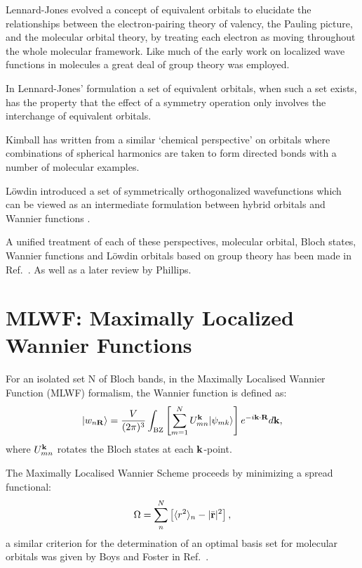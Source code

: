 Lennard-Jones evolved a concept of equivalent 
orbitals \cite{lennardjones49a,lennardjones49b, hall50}
to elucidate the relationships between the electron-pairing theory of valency, 
the Pauling picture, and the molecular orbital theory, by treating each 
electron as moving throughout the whole molecular 
framework. Like much of the early work on localized wave functions in molecules 
a great deal of group theory was employed.

In Lennard-Jones' formulation a set of equivalent orbitals, 
when such a set exists, has the property that the effect of a symmetry 
operation only involves the interchange of equivalent orbitals.

Kimball has written from a similar `chemical perspective' 
on orbitals where combinations of spherical harmonics are taken to form
directed bonds \cite{kimball41} with a number of molecular examples.

L\"owdin introduced a set of symmetrically orthogonalized wavefunctions which 
can be viewed as an intermediate formulation between hybrid orbitals 
and Wannier functions \cite{lowdin56}.

A unified treatment of each of these perspectives, molecular orbital,
Bloch states, Wannier functions and L\"owdin orbitals based on group theory 
has been made in Ref.~\cite{altmann58}. As well as a later review by Phillips\cite{phillips70}.

\section{MLWF: Maximally Localized Wannier Functions}
For an isolated set N of Bloch bands, in the Maximally Localised Wannier Function
(MLWF) formalism, the Wannier function is defined as:
%
\begin{equation}
|w_{n{\bf R}}\rangle = \frac{V}{(2\pi)^{3}}\int_{\rm BZ} \left[ \sum_{m=1}^{N} U^{{\bf k}}_{mn}|\psi_{mk}\rangle \right]e^{-i{\bf k}\cdot{\bf R}}d{\bf k},
\end{equation}
%
where $U_{mn}^{{\bf k}}$ rotates the Bloch states at each ${\bf k}$-point.

The Maximally Localised Wannier Scheme proceeds by minimizing a spread functional:
%
\begin{equation}
\Omega = \sum_{n}^{N} \left[ \langle r^{2} \rangle_{n} - |\bar{{\bf r}}|^{2} \right],
\end{equation}
%
a similar criterion for the determination of an optimal basis set for
molecular orbitals was given by Boys and Foster in Ref.~\cite{boys60b}.

